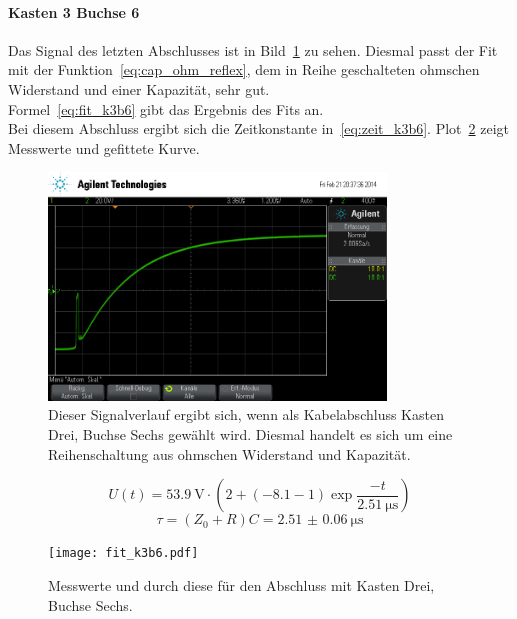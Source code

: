 \paragraph{Kasten 3 Buchse 6}
Das Signal des letzten Abschlusses ist in Bild~\ref{fig:k3b6} zu 
sehen. 
Diesmal passt der Fit mit der 
Funktion~\eqref{eq:cap_ohm_reflex}, dem in Reihe geschalteten 
ohmschen Widerstand und einer Kapazität, sehr gut.\\
Formel~\eqref{eq:fit_k3b6} gibt das Ergebnis des Fits an.\\
Bei diesem Abschluss ergibt sich die Zeitkonstante 
in~\eqref{eq:zeit_k3b6}. 
Plot~\ref{fig:fit_k3b6} zeigt Messwerte und gefittete Kurve.\\
%
\begin{figure}[]
\centering
\includegraphics[width=0.8\textwidth]{k3b6.png}
\caption{Dieser Signalverlauf ergibt sich, wenn als Kabelabschluss 
Kasten Drei, Buchse Sechs gewählt wird. Diesmal handelt es sich 
um eine Reihenschaltung aus ohmschen Widerstand und Kapazität.}
\label{fig:k3b6}
\end{figure}
%
\begin{equation}
U(t) = \SI{53.9}{\volt}\cdot\left(2 + 
\left(-8.1 - 1\right)\exp{\frac{-t}{\SI{2.51}{\micro\second}}}\right)
\label{eq:fit_k3b6}
\end{equation}
%
\begin{equation}
\tau = (Z_0 + R)C = \SI{2.51(6)}{\micro\second}
\label{eq:zeit_k3b6}
\end{equation}
%
\begin{figure}[]
\centering
\texttt{[image: fit\_k3b6.pdf]}
\caption{Messwerte und durch diese für den Abschluss mit 
Kasten Drei, Buchse Sechs.}
\label{fig:fit_k3b6}
\end{figure}
%
\FloatBarrier
%
